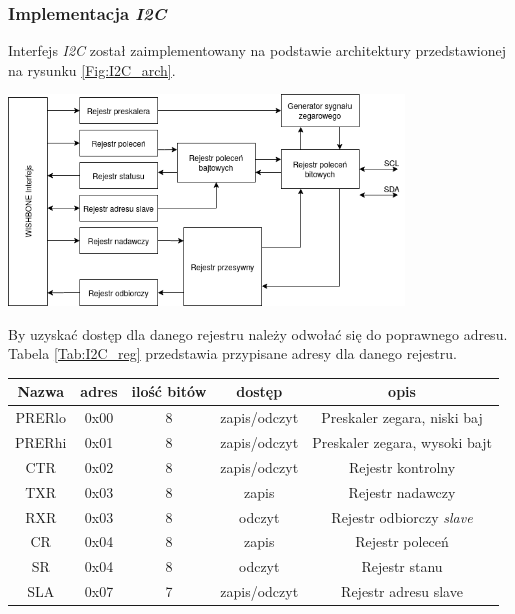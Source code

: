 \documentclass[11pt,a4paper]{article}
\begin{document}
		\subsubsection{Implementacja \textit{I2C}}
		\hspace{5mm} Interfejs \textit{I2C} został zaimplementowany na podstawie architektury przedstawionej na rysunku \ref{Fig:I2C_arch}. \\
			\begin{minipage}[c]{\textwidth}
					\includegraphics[width=\textwidth,height=5.6cm]{./rysunki/i2c_arch.png}
			\end{minipage} 
			By uzyskać dostęp dla danego rejestru należy odwołać się do poprawnego adresu. Tabela \ref{Tab:I2C_reg} przedstawia przypisane adresy dla danego rejestru.\\
			 \begin{minipage}{\textwidth}
		 \begin{center}
				\begin{tabular}{|c|c|c|c|c|}
					\hline
					Nazwa & adres & ilość bitów & dostęp & opis \\ 
					\hline
					PRERlo & 0x00 & 8 & zapis/odczyt & Preskaler zegara, niski baj \\
					\hline
					PRERhi & 0x01 & 8 &zapis/odczyt & Preskaler zegara, wysoki bajt \\
					\hline
					CTR & 0x02 & 8 &zapis/odczyt & Rejestr kontrolny\\
					\hline
					TXR & 0x03 & 8 &zapis & Rejestr nadawczy\\
					\hline
					RXR & 0x03 & 8 & odczyt & Rejestr odbiorczy \textit{slave} \\
					\hline
					CR & 0x04 & 8 & zapis & Rejestr poleceń\\
					\hline
					SR & 0x04 & 8 & odczyt & Rejestr stanu\\
					\hline
					SLA & 0x07 & 7 &zapis/odczyt & Rejestr adresu slave\\
					\hline
				\end{tabular}
		\end{center}
		\end{minipage}
\end{document}
